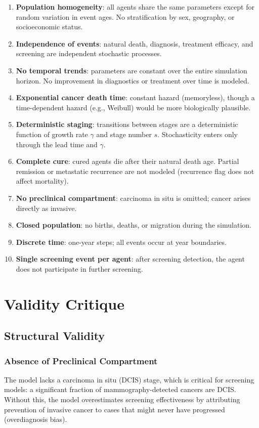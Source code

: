 \documentclass[12pt,a4paper]{article}
\begin{document}
\begin{enumerate}[nosep]
    \item \textbf{Population homogeneity}: all agents share the same parameters except for random variation in event ages. No stratification by sex, geography, or socioeconomic status.
    \item \textbf{Independence of events}: natural death, diagnosis, treatment efficacy, and screening are independent stochastic processes.
    \item \textbf{No temporal trends}: parameters are constant over the entire simulation horizon. No improvement in diagnostics or treatment over time is modeled.
    \item \textbf{Exponential cancer death time}: constant hazard (memoryless), though a time-dependent hazard (e.g., Weibull) would be more biologically plausible.
    \item \textbf{Deterministic staging}: transitions between stages are a deterministic function of growth rate $\gamma$ and stage number $s$. Stochasticity enters only through the lead time and $\gamma$.
    \item \textbf{Complete cure}: cured agents die after their natural death age. Partial remission or metastatic recurrence are not modeled (recurrence flag does not affect mortality).
    \item \textbf{No preclinical compartment}: carcinoma in situ is omitted; cancer arises directly as invasive.
    \item \textbf{Closed population}: no births, deaths, or migration during the simulation.
    \item \textbf{Discrete time}: one-year steps; all events occur at year boundaries.
    \item \textbf{Single screening event per agent}: after screening detection, the agent does not participate in further screening.
\end{enumerate}

\section{Validity Critique}

\subsection{Structural Validity}

\subsubsection{Absence of Preclinical Compartment}
The model lacks a carcinoma in situ (DCIS) stage, which is critical for screening models: a significant fraction of mammography-detected cancers are DCIS. Without this, the model overestimates screening effectiveness by attributing prevention of invasive cancer to cases that might never have progressed (overdiagnosis bias).
\end{document}
